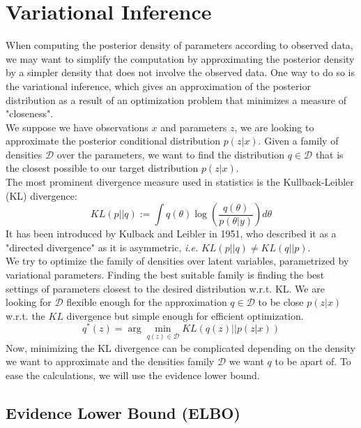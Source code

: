\section{Variational Inference}
When computing the posterior density of parameters according to observed data, we may want to simplify the computation by approximating the posterior density by a simpler density that does not involve the observed data. One way to do so is the variational inference, which gives an approximation of the posterior distribution as a result of an optimization problem that minimizes a measure of "closeness".\\
\newline
We suppose we have observations $x$ and parameters $z$, we are looking to approximate the posterior conditional distribution $p(z|x)$. Given a family of densities $\mathcal{D}$ over the parameters, we want to find the distribution $q \in \mathcal{D}$ that is the closest possible to our target distribution $p(z|x)$.\\
\newline
The most prominent divergence measure used in statistics is the Kullback-Leibler (KL) divergence:
\begin{equation}
KL(p||q) := \int q(\theta)\log\left(\frac{q(\theta)}{p(\theta|y)}\right) d\theta
\label{eq:KL_div}
\end{equation}
It has been introduced by Kulback and Leibler in 1951, who described it as a "directed divergence" as it is asymmetric, \textit{i.e. }$KL(p||q) \neq KL(q||p)$.\\
\newline
We try to optimize the family of densities over latent variables, parametrized by variational parameters. Finding the best suitable family is finding the best settings of parameters closest to the desired distribution w.r.t. KL. We are looking for $\mathcal{D}$ flexible enough for the approximation $q \in \mathcal{D}$ to be close $p(z|x)$ w.r.t. the $KL$ divergence but simple enough for efficient optimization.\\

\begin{equation}
q^*(z) = \arg\min_{q(z) \in \mathcal{D}} KL(q(z)||p(z|x))
\label{eq:best_q}
\end{equation}
Now, minimizing the KL divergence can be complicated depending on the density we want to approximate and the densities family $\mathcal{D}$ we want $q$ to be apart of. To ease the calculations, we will use the evidence lower bound.
\subsection{Evidence Lower Bound (ELBO)}

